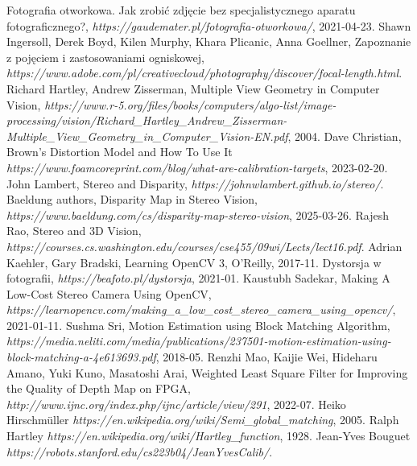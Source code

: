 \documentclass[magisterska]{pracadypl}
\begin{document}
\begin{thebibliography}{7}
\raggedright

 Fotografia otworkowa. Jak zrobić zdjęcie bez specjalistycznego aparatu fotograficznego?, \textit{https://gaudemater.pl/fotografia-otworkowa/}, 2021-04-23.
 Shawn Ingersoll, Derek Boyd, Kilen Murphy, Khara Plicanic, Anna Goellner, Zapoznanie z pojęciem i zastosowaniami ogniskowej, \textit{https://www.adobe.com/pl/creativecloud/photography/discover/focal-length.html}.
 Richard Hartley, Andrew Zisserman, Multiple View Geometry in Computer Vision, \textit{https://www.r-5.org/files/books/computers/algo-list/image-processing/vision/Richard\_Hartley\_Andrew\_Zisserman-Multiple\_View\_Geometry\_in\_Computer\_Vision-EN.pdf}, 2004.
 Dave Christian, Brown's Distortion Model and How To Use It \textit{https://www.foamcoreprint.com/blog/what-are-calibration-targets}, 2023-02-20.
 John Lambert, Stereo and Disparity, \textit{https://johnwlambert.github.io/stereo/}.
 Baeldung authors, Disparity Map in Stereo Vision, \textit{https://www.baeldung.com/cs/disparity-map-stereo-vision}, 2025-03-26.
 Rajesh Rao, Stereo and 3D Vision, \textit{https://courses.cs.washington.edu/courses/cse455/09wi/Lects/lect16.pdf}.
 Adrian Kaehler, Gary Bradski, Learning OpenCV 3, O'Reilly, 2017-11.
 Dystorsja w fotografii, \textit{https://beafoto.pl/dystorsja}, 2021-01.
 Kaustubh Sadekar, Making A Low-Cost Stereo Camera Using OpenCV, \textit{https://learnopencv.com/making\_a\_low\_cost\_stereo\_camera\_using\_opencv/}, 2021-01-11.
 Sushma Sri, Motion Estimation using Block Matching
Algorithm, \textit{https://media.neliti.com/media/publications/237501-motion-estimation-using-block-matching-a-4e613693.pdf}, 2018-05.
 Renzhi Mao, Kaijie Wei, Hideharu Amano, Yuki Kuno, Masatoshi Arai, Weighted Least Square Filter for Improving the Quality of Depth Map on FPGA, \textit{http://www.ijnc.org/index.php/ijnc/article/view/291}, 2022-07.
 Heiko Hirschmüller \textit{https://en.wikipedia.org/wiki/Semi\_global\_matching}, 2005.
 Ralph Hartley \textit{https://en.wikipedia.org/wiki/Hartley\_function}, 1928.
 Jean-Yves Bouguet \textit{https://robots.stanford.edu/cs223b04/JeanYvesCalib/}.

\end{thebibliography}
\end{document}

